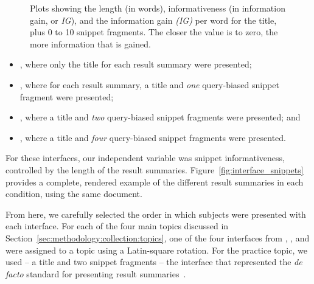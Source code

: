 \begin{figure}[t!]
    \centering
    \caption[Information gain plots]{Plots showing the length (in words), informativeness (in information gain, or \emph{IG}), and the information gain \emph{(IG)} per word for the title, plus 0 to 10 snippet fragments. The closer the value is to zero, the more information that is gained.}
    \label{fig:ig_plots}
\end{figure}

\begin{itemize}
    \item{, where only the title for each result summary were presented;}
    \item{, where for each result summary, a title and \emph{one} query-biased snippet fragment were presented;}
    \item{, where a title and \emph{two} query-biased snippet fragments were presented; and}
    \item{, where a title and \emph{four} query-biased snippet fragments were presented.}
\end{itemize}

For these interfaces, our independent variable was snippet informativeness, controlled by the length of the result summaries. Figure~\ref{fig:interface_snippets} provides a complete, rendered example of the different result summaries in each condition, using the same document.

From here, we carefully selected the order in which subjects were presented with each interface. For each of the four main topics discussed in Section~\ref{sec:methodology:collection:topics}, one of the four interfaces from , ,  and  were assigned to a topic using a Latin-square rotation. For the practice topic, we used  -- a title and two snippet fragments -- the interface that represented the \emph{de facto} standard for presenting result summaries~\citep{hearst2009_search}.

